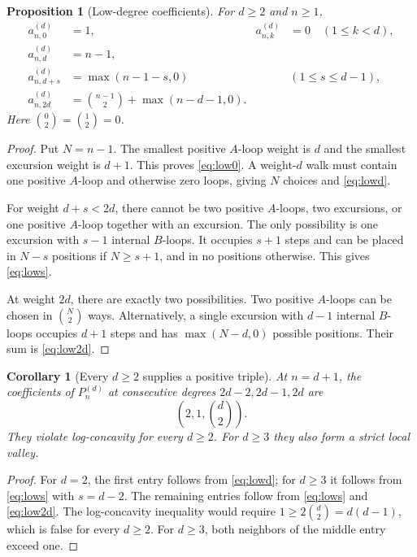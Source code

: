 \documentclass[11pt,letterpaper]{article}
\numberwithin{equation}{section}
\newtheorem{proposition}[theorem]{Proposition}
\newtheorem{corollary}[theorem]{Corollary}
\theoremstyle{definition}
\begin{document}
\begin{proposition}[Low-degree coefficients]\label{prop:low}
For $d\geq2$ and $n\geq1$,
\begin{align}
 a_{n,0}^{(d)}&=1,&
 a_{n,k}^{(d)}&=0\quad(1\leq k<d),\label{eq:low0}\\
 a_{n,d}^{(d)}&=n-1,\label{eq:lowd}\\
 a_{n,d+s}^{(d)}&=\max(n-1-s,0)
                 &&(1\leq s\leq d-1),\label{eq:lows}\\
 a_{n,2d}^{(d)}&=\binom{n-1}{2}+\max(n-d-1,0).
 \label{eq:low2d}
\end{align}
Here $\binom{0}{2}=\binom{1}{2}=0$.
\end{proposition}
\begin{proof}
Put $N=n-1$. The smallest positive $A$-loop weight is $d$ and the smallest
excursion weight is $d+1$. This proves \eqref{eq:low0}. A weight-$d$ walk
must contain one positive $A$-loop and otherwise zero loops, giving $N$
choices and \eqref{eq:lowd}.

For weight $d+s<2d$, there cannot be two positive $A$-loops, two excursions,
or one positive $A$-loop together with an excursion. The only possibility
is one excursion with $s-1$ internal $B$-loops. It occupies $s+1$ steps and
can be placed in $N-s$ positions if $N\geq s+1$, and in no positions
otherwise. This gives \eqref{eq:lows}.

At weight $2d$, there are exactly two possibilities. Two positive $A$-loops
can be chosen in $\binom N2$ ways. Alternatively, a single excursion with
$d-1$ internal $B$-loops occupies $d+1$ steps and has
$\max(N-d,0)$ possible positions. Their sum is \eqref{eq:low2d}.
\end{proof}

\begin{corollary}[Every $d\geq2$ supplies a positive triple]\label{cor:generaltriple}
At $n=d+1$, the coefficients of $P_n^{(d)}$ at consecutive degrees
$2d-2,2d-1,2d$ are
\begin{equation}\label{eq:generaltriple}
 \left(2,1,\binom d2\right).
\end{equation}
They violate log-concavity for every $d\geq2$. For $d\geq3$ they also form
a strict local valley.
\end{corollary}
\begin{proof}
For $d=2$, the first entry follows from \eqref{eq:lowd}; for $d\geq3$ it
follows from \eqref{eq:lows} with $s=d-2$. The remaining entries follow
from \eqref{eq:lows} and \eqref{eq:low2d}. The log-concavity inequality
would require $1\geq2\binom d2=d(d-1)$, which is false for every $d\geq2$.
For $d\geq3$, both neighbors of the middle entry exceed one.
\end{proof}
\end{document}
